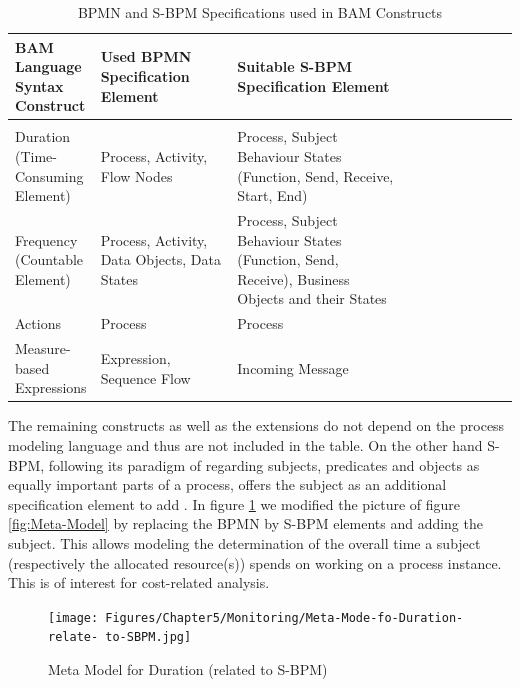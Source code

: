 \begin{table}[htbp]
	\footnotesize
	\centering
	\begin{tabular}[t]{@{}l p{0.3\linewidth} p{0.4\linewidth} p{0.5\linewidth} @{}}
	\toprule
	\textbf{BAM Language Syntax Construct} & \textbf{Used BPMN Specification Element}  & \textbf{Suitable S-BPM Specification Element}\\
	\midrule\\
	Duration (Time-Consuming Element) &	Process, Activity, Flow Nodes&	Process, Subject Behaviour States (Function, Send, Receive, Start, End)
	\\
	Frequency
	(Countable Element)&	Process, Activity, Data Objects, Data States &	Process, Subject Behaviour States (Function, Send, Receive), Business Objects and their States
	\\
	Actions &	Process	 & Process
	\\
	Measure-based Expressions &	Expression, Sequence Flow &	Incoming Message
	\\
	\bottomrule
\end{tabular}
\caption{BPMN and S-BPM Specifications used in BAM Constructs}
\label{tbl:MonBPMNSBPM}
\end{table}

The remaining constructs as well as the extensions do not depend on the process modeling language and thus are not included in the table.
On the other hand S-BPM, following its paradigm of regarding subjects, predicates and objects as equally important parts of a process, offers the subject as an additional specification element to add . In figure \ref{fig:Meta-Model-S_BPM} we modified the picture of figure \ref{fig:Meta-Model} by replacing the BPMN by S-BPM elements and adding the subject. This allows modeling the determination of the overall time a subject (respectively the allocated resource(s)) spends on working on a process instance. This is of interest for cost-related analysis.

\begin{figure}[htbp]
	\centering
	\texttt{[image: Figures/Chapter5/Monitoring/Meta-Mode-fo-Duration-relate- to-SBPM.jpg]}
	\caption[Meta Model for Duration (related to S-BPM)]{Meta Model for Duration (related to S-BPM)}
	\label{fig:Meta-Model-S_BPM}
\end{figure}


